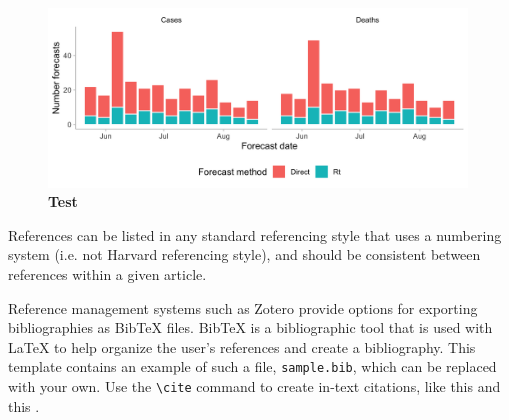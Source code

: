 \documentclass[10pt,a4paper,twocolumn]{article}
\begin{document}

\begin{figure}[H]
\centering
\includegraphics[width=0.99\textwidth]{../output/figures/num-forecasters-week.png}
\caption{\bf{Test}}
\label{fig:num-forecasters}
\end{figure}


\clearpage

{\small
}

\bigskip
References can be listed in any standard referencing style that uses a numbering system
(i.e. not Harvard referencing style), and should be consistent between references within
a given article.

Reference management systems such as Zotero provide options for exporting bibliographies as Bib\TeX{} files. Bib\TeX{} is a bibliographic tool that is used with \LaTeX{} to help organize the user's references and create a bibliography. This template contains an example of such a file, \texttt{sample.bib}, which can be replaced with your own. Use the \verb|\cite| command  to create in-text citations, like this \cite{Smith:2012qr} and this \cite{Smith:2013jd}.






\end{document}
